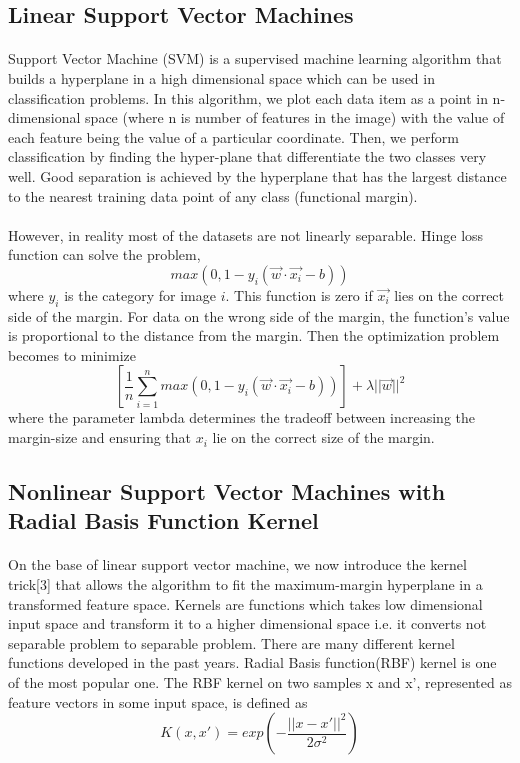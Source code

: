 \documentclass{article}
\begin{document}
\subsection{Linear Support Vector Machines}
\paragraph{}
Support Vector Machine (SVM) is a supervised machine learning algorithm that builds a hyperplane in a high dimensional space which can be used in classification problems. In this algorithm, we plot each data item as a point in n-dimensional space (where n is number of features in the image) with the value of each feature being the value of a particular coordinate. Then, we perform classification by finding the hyper-plane that differentiate the two classes very well. Good separation is achieved by the hyperplane that has the largest distance to the nearest training data point of any class (functional margin).
\paragraph{}
However, in reality most of the datasets are not linearly separable. Hinge loss function can solve the problem,
\[ max(0, 1-y_i(\vec{w} \cdot \vec{x_i}-b))\]
where $y_i$ is the category for image $i$. This function is zero if $\vec{x_i}$ lies on the correct side of the margin. For data on the wrong side of the margin, the function's value is proportional to the distance from the margin. Then the optimization problem becomes to minimize\[
[\frac{1}{n}\sum_{i=1}^n max(0,1-y_i(\vec{w} \cdot \vec{x_i}-b))]+\lambda ||\vec{w} ||^2 \]
where the parameter lambda determines the tradeoff between increasing the margin-size and ensuring that $x_i$ lie on the correct size of the margin. 

\subsection{Nonlinear Support Vector Machines with Radial Basis Function Kernel}
\paragraph{}
On the base of linear support vector machine, we now introduce the kernel trick[3] that allows the algorithm to fit the maximum-margin hyperplane in a transformed feature space. Kernels are functions which takes low dimensional input space and transform it to a higher dimensional space i.e. it converts not separable problem to separable problem. There are many different kernel functions developed in the past years. Radial Basis function(RBF) kernel is one of the most popular one. The RBF kernel on two samples x and x', represented as feature vectors in some input space, is defined as
\[K(x,x') = exp(-\frac{||x-x'||^2}{2\sigma^2}) \]
\end{document}
